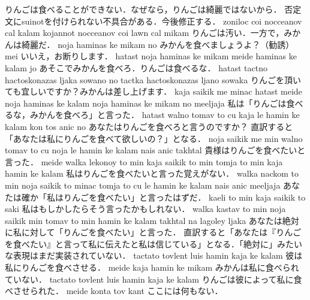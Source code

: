 \documentclass[../../main-detail.tex]{subfiles}
\begin{document}
\begin{exe}
    \glt りんごは食べることができない．なぜなら，りんごは綺麗ではないから．
    \glt 否定文にsuinotを付けられない不具合がある．今後修正する．
    \ex zoniloc coi nocceanov cal kalam kojannot nocceanov coi lawn cal mikam
    \glt りんごは汚い．一方で，みかんは綺麗だ．
    \ex noja haminas ke mikam no
    \glt みかんを食べましょうよ？（勧誘）
    \ex mei
    \glt いいえ，お断りします．
    \ex hatast noja haminas ke mikam meide haminas ke kalam jo
    \glt あそこでみかんを食べろ．りんごは食べるな．
    \ex hatast tactno hactoskonazas ljaka sowano no tactka hactoskonazas ljano sowaka
    \glt りんごを頂いても宜しいですか？みかんは差し上げます．
    \ex kaja saikik me minac hatast meide noja haminas ke kalam noja haminas ke mikam no meeljaja
    \glt 私は「りんごは食べるな，みかんを食べろ」と言った．
    \ex hatast walno tomav to cu kaja le hamin ke kalam kon tos anic no
    \glt あなたはりんごを食べろと言うのですか？
    \glt 直訳すると「あなたは私にりんごを食べて欲しいの？」となる．
    \ex noja saikik me min walno tomav to cu noja le hamin ke kalam nais anic takhtal
    \glt 貴様はりんごを食べたいと言った．
    \ex meide walka lekonoy to min kaja saikik to min tomja to min kaja hamin ke kalam
    \glt 私はりんごを食べたいと言った覚えがない．
    \ex walka nackom to min noja saikik to minac tomja to cu le hamin ke kalam nais anic meeljaja
    \glt あなたは確か「私はりんごを食べたい」と言ったはずだ．
    \ex kaeli to min kaja saikik to saki
    \glt 私はもしかしたらそう言ったかもしれない．
    \ex walka kastav to min noja saikik min tomav to min hamin ke kalam takhtal na lagoley ljaka
    \glt あなたは絶対に私に対して「りんごを食べたい」と言った．
    \glt 直訳すると「あなたは『りんごを食べたい』と言って私に伝えたと私は信じている」となる．「絶対に」みたいな表現はまだ実装されていない．
    \ex tactato tovlent luis hamin kaja ke kalam
    \glt 彼は私にりんごを食べさせる．
    \ex meide kaja hamin ke mikam
    \glt みかんは私に食べられていない．
    \ex tactato tovlent luis hamin kaja ke kalam
    \glt りんごは彼によって私に食べさせられた．
    \ex meide konta tov kant
    \glt ここには何もない．
\end{exe}
\end{document}

